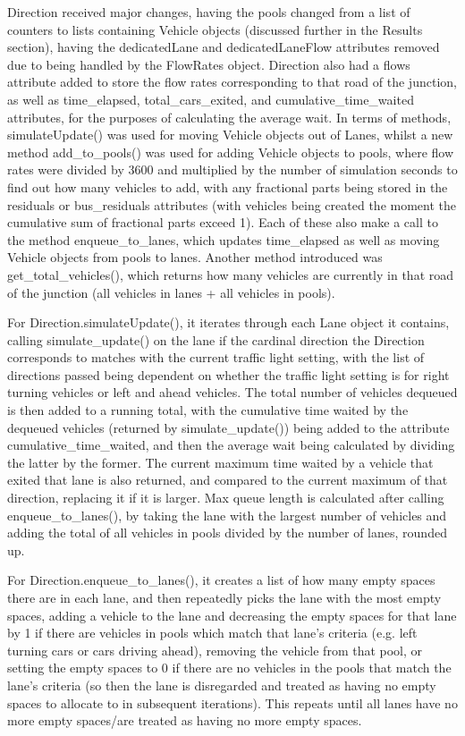 \documentclass{article}
\begin{document}
    Direction received major changes, having the pools changed from a list of counters to lists containing Vehicle objects (discussed further
    in the Results section), having the dedicatedLane and dedicatedLaneFlow attributes removed due to being handled by the FlowRates object.
    Direction also had a flows attribute added to store the flow rates corresponding to that road of the junction, as well as time\_elapsed,
    total\_cars\_exited, and cumulative\_time\_waited attributes, for the purposes of calculating the average wait. In terms of methods,
    simulateUpdate() was used for moving Vehicle objects out of Lanes, whilst a new method add\_to\_pools() was used for adding Vehicle objects
    to pools, where flow rates were divided by 3600 and multiplied by the number of simulation seconds to find out how many vehicles to add,
    with any fractional parts being stored in the residuals or bus\_residuals attributes (with vehicles being created the moment the cumulative sum
    of fractional parts exceed 1). Each of these also make a call to the method enqueue\_to\_lanes, which updates time\_elapsed as well as moving
    Vehicle objects from pools to lanes. Another method introduced was get\_total\_vehicles(), which returns how many vehicles are currently in
    that road of the junction (all vehicles in lanes + all vehicles in pools).

    For Direction.simulateUpdate(), it iterates through each Lane object it contains, calling simulate\_update() on the lane if the cardinal direction 
    the Direction corresponds to matches with the current traffic light setting, with the list of directions passed being dependent on whether the 
    traffic light setting is for right turning vehicles or left and ahead vehicles. The total number of vehicles dequeued is then added to a running 
    total, with the cumulative time waited by the dequeued vehicles (returned by simulate\_update()) being added to the attribute cumulative\_time\_waited, 
    and then the average wait being calculated by dividing the latter by the former. The current maximum time waited by a vehicle that exited that lane 
    is also returned, and compared to the current maximum of that direction, replacing it if it is larger. Max queue length is calculated after calling 
    enqueue\_to\_lanes(), by taking the lane with the largest number of vehicles and adding the total of all vehicles in pools divided by the number of 
    lanes, rounded up.

    For Direction.enqueue\_to\_lanes(), it creates a list of how many empty spaces there are in each lane, and then repeatedly picks the lane with the most 
    empty spaces, adding a vehicle to the lane and decreasing the empty spaces for that lane by 1 if there are vehicles in pools which match that lane’s 
    criteria (e.g. left turning cars or cars driving ahead), removing the vehicle from that pool, or setting the empty spaces to 0 if there are no vehicles 
    in the pools that match the lane’s criteria (so then the lane is disregarded and treated as having no empty spaces to allocate to in subsequent 
    iterations). This repeats until all lanes have no more empty spaces/are treated as having no more empty spaces.
\end{document}
